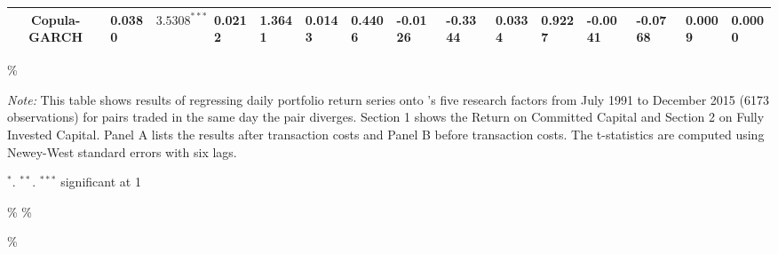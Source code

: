 \documentclass[a4paper]{article}
\begin{document}
\begin{sidewaystable}
\begin{threeparttable}[H]
\begin{tabularx}{\textwidth}{@{\extracolsep{\fill}}lllllllllllllll@{}}
				\multicolumn{1}{c}{Copula-GARCH} & 0.0380 & $3.5308^{***}$ & 0.0212 & 1.3641 & 0.0143 & 0.4406 & -0.0126 & -0.3344 & 0.0334 & 0.9227 & -0.0041 & -0.0768 & 0.0009 & 0.0000 \\
				\bottomrule
			\end{tabularx}\%
			\begin{tablenotes}
				\item \textit{Note:} \scriptsize  This table shows results of regressing daily portfolio return series onto \citet*{ff15}'s five research factors from July 1991 to December 2015 (6173 observations) for pairs traded in the same day the pair diverges. Section 1 shows the Return on Committed Capital and Section 2 on Fully Invested Capital. Panel A lists the results after transaction costs and Panel B before transaction costs. The t-statistics are computed using Newey-West standard errors with six lags.
				\item \scriptsize $^{\ast}$. $^{\ast\ast}$. $^{\ast\ast\ast}$  significant at 1\\%
			\end{tablenotes}
		\end{threeparttable}\%
		\label{tab:table113}\%
	\end{sidewaystable}\%
\end{document}
